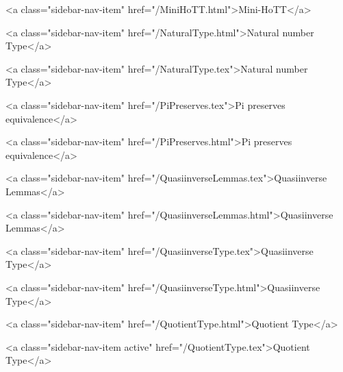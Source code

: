       
        
          <a class="sidebar-nav-item" href="/MiniHoTT.html">Mini-HoTT</a>
        
      
    
      
        
          <a class="sidebar-nav-item" href="/NaturalType.html">Natural number Type</a>
        
      
    
      
        
          <a class="sidebar-nav-item" href="/NaturalType.tex">Natural number Type</a>
        
      
    
      
        
          <a class="sidebar-nav-item" href="/PiPreserves.tex">Pi preserves equivalence</a>
        
      
    
      
        
          <a class="sidebar-nav-item" href="/PiPreserves.html">Pi preserves equivalence</a>
        
      
    
      
        
          <a class="sidebar-nav-item" href="/QuasiinverseLemmas.tex">Quasiinverse Lemmas</a>
        
      
    
      
        
          <a class="sidebar-nav-item" href="/QuasiinverseLemmas.html">Quasiinverse Lemmas</a>
        
      
    
      
        
          <a class="sidebar-nav-item" href="/QuasiinverseType.tex">Quasiinverse Type</a>
        
      
    
      
        
          <a class="sidebar-nav-item" href="/QuasiinverseType.html">Quasiinverse Type</a>
        
      
    
      
        
          <a class="sidebar-nav-item" href="/QuotientType.html">Quotient Type</a>
        
      
    
      
        
          <a class="sidebar-nav-item active" href="/QuotientType.tex">Quotient Type</a>
        

